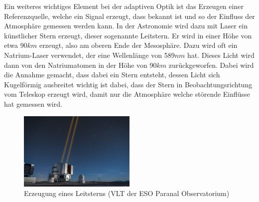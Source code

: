 \begin{refsection}
Ein weiteres wichtiges Element bei der adaptiven Optik ist das Erzeugen einer Referenzquelle, welche ein Signal erzeugt, dass bekannt ist und so der Einfluss der Atmosphäre gemessen werden kann. In der Astronomie wird dazu mit Laser ein künstlicher Stern erzeugt, dieser sogenannte Leitstern. Er wird in einer Höhe von etwa 90$km$ erzeugt, also am oberen Ende der Mesosphäre. Dazu wird oft ein Natrium-Laser verwendet, der eine Wellenlänge von 589$nm$ hat. Dieses Licht wird dann von den Natriumatomen in der Höhe von 90$km$ zurückgeworfen. Dabei wird die Annahme gemacht, dass dabei ein Stern entsteht, dessen Licht sich Kugelförmig ausbreitet wichtig ist dabei, dass der Stern in Beobachtungsrichtung vom Teleskop erzeugt wird, damit nur die Atmosphäre welche störende Einflüsse hat gemessen wird. 

\begin{figure}
  \centering
  \includegraphics[width=0.5\textwidth]{adaptiv/images/Leitstern}
  \caption{Erzeugung eines Leitsterns (VLT der ESO Paranal Observatorium)
    \cite{eso:leitstern}}
  \label{fig:leitstern}
\end{figure}


\end{refsection}
